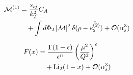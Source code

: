 \begin{align}
  \mathcal{M}^{(1)} &= \frac{s_{ij}}{k_T^2} C_A \nonumber \\
  &\quad + \int d\Phi_{2} \, |\mathcal{M}|^2 \, \delta(\rho - \hat{e_2^{(2)}}) + \mathcal{O}(\alpha_s^3) \label{eq:7}
\end{align}

\begin{align}
  F(x) &= \frac{\Gamma(1-\epsilon)}{\epsilon^{n}} \left(\frac{\mu^2}{Q^2}\right)^{\epsilon} \nonumber \\
  &\quad + \mathrm{Li}_{2}(1 - x) + \mathcal{O}(\alpha_s^3) \label{eq:9}
\end{align}

